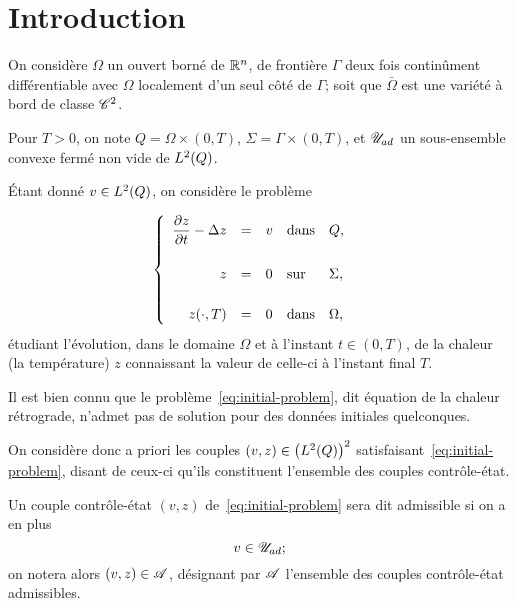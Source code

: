 \section{Introduction}

On considère $\Omega$ un ouvert borné de ${\mathbb{R}}^{n}$, de frontière
${\Gamma}$ deux fois continûment différentiable avec $\Omega$ localement
d'un seul côté de $\Gamma$; soit que $\bar{\Omega}$ est une variété à bord
de classe ${\mathscr{C}}^{2}$.

Pour $T > 0$, on note $\displaystyle Q = \Omega\times(0,T)$, $\displaystyle
\Sigma = \Gamma\times (0,T)$, et $\displaystyle {\mathscr{U}}_{ad}$ un
sous-ensemble convexe fermé non vide de $L^{2}\!\left({Q}\right)$.

Étant donné $v\in L^{2}\!\left({Q}\right)$, on considère le problème

\begin{equation}\label{eq:initial-problem}
    \begin{cases}\displaystyle
        \begin{array}{rclll}
            \dfrac{\partial{}z}{\partial{}t} - \Delta z & = & v & \text{dans} & Q,\\
            \\
            z & = & 0 & \text{sur} & \Sigma,\\
            \\
            {z}\!\left({\cdot,T}\right) & = & 0 & \text{dans} & \Omega,
        \end{array}
    \end{cases}
\end{equation}
étudiant l'évolution, dans le domaine $\Omega$ et à l'instant $t\in (0,T)$,
de la chaleur (la température) $z$ connaissant la valeur de celle-ci à
l'instant final $T$.

Il est bien connu que le problème~\eqref{eq:initial-problem}, dit équation
de la chaleur rétrograde, n'admet pas de solution pour des données
initiales quelconques.

On considère donc a priori les couples $(v,z)\in
{\left({L^{2}\!\left({Q}\right)}\right)}^{2}$ satisfaisant~\eqref{eq:initial-problem},
disant de ceux-ci qu'ils constituent l'ensemble des couples contrôle-état.

Un couple contrôle-état $(v,z)$ de~\eqref{eq:initial-problem} sera dit
admissible si on a en plus
\begin{equation*}\label{eq:admissible-control-state-pair}
    v\in {\mathscr{U}}_{ad};
\end{equation*}
on notera alors $(v,z)\in \mathscr{A}$, désignant par $\mathscr{A}$ l'ensemble des
couples contrôle-état admissibles.

